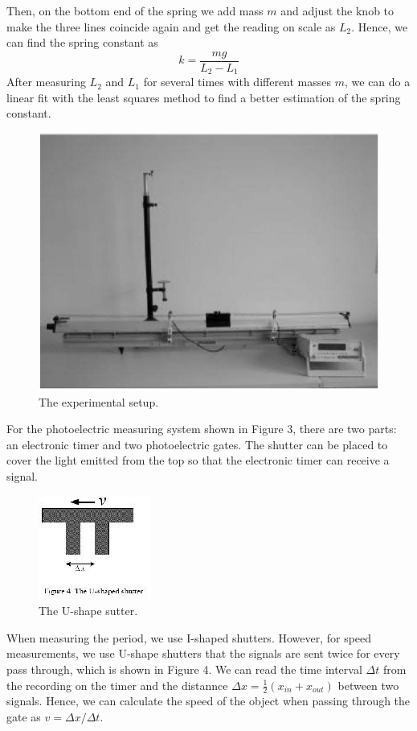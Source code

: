 \documentclass[a4paper]{report}
\begin{document}
	Then, on the bottom end of the spring we add mass $m$ and adjust the knob to make the three lines coincide again and get the reading on scale as $L_2$. Hence, we can find the spring constant as
	\begin{equation}
	k=\dfrac{mg}{L_2-L_1}
	\end{equation}
	After measuring $L_2$ and $L_1$ for several times with different masses $m$, we can do a linear fit with the least squares method to find a better estimation of the spring constant.
	\begin{figure}[H]
		\centering
		\includegraphics[width=0.9\linewidth]{3.jpg}
		\caption{The experimental setup.}
	\end{figure}
	For the photoelectric measuring system shown in Figure 3, there are two parts: an electronic timer and two photoelectric gates. The shutter can be placed to cover the light emitted from the top so that the electronic timer can receive a signal.
	\begin{figure}[H]
		\centering
		\includegraphics[width=0.5\linewidth]{4.jpg}
		\caption{The U-shape sutter.}
	\end{figure}
	When measuring the period, we use I-shaped shutters. However, for speed measurements, we use U-shape shutters that the signals are sent twice for every pass through, which is shown in Figure 4. We can read the time interval $\Delta t$ from the recording on the timer and the distannce $\Delta x=\frac{1}{2}(x_{in}+x_{out})$ between two signals. Hence, we can calculate the speed of the object when passing through the gate as $v=\Delta x/\Delta t$.
	
\end{document}
